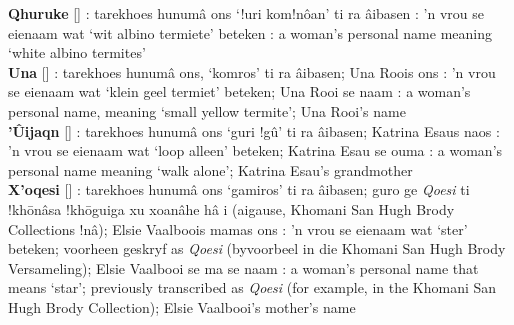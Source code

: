 \textbf{\textvertline{}Qhuruke}
[] : tarekhoes
\textdoublebarpipe{}hunum\^{a} \textvertline{}ons `!uri kom!n\^{o}an'
ti ra \textdoublebarpipe{}\^{a}ibasen : 'n vrou se
eienaam wat `wit albino termiete' beteken : a woman's
personal name meaning `white albino termites' \\

\textbf{\textvertline{}Una} []
: tarekhoes \textdoublebarpipe{}hunum\^{a}
\textvertline{}ons, `komros' ti ra \textdoublebarpipe{}\^{a}ibasen;
\textvertline{}Una Roois \textvertline{}ons : 'n vrou se
eienaam wat `klein geel termiet' beteken; \textvertline{}Una Rooi se
naam : a woman's personal name, meaning `small yellow
termite'; \textvertline{}Una Rooi's name \\

\textbf{\textdoublevertline{}'\^{U}ijaqn}
[]
: tarekhoes \textdoublebarpipe{}hunum\^{a}
\textvertline{}ons `\textvertline{}guri !g\^{u}' ti ra
\textdoublebarpipe{}\^{a}ibasen; Katrina Esaus
\textdoublevertline{}naos : 'n vrou se eienaam wat `loop
alleen' beteken; Katrina Esau se ouma : a woman's
personal name meaning `walk alone'; Katrina Esau's grandmother \\

\textbf{\textdoublevertline{}X'oqesi}
[] :
tarekhoes \textdoublebarpipe{}hunum\^{a} \textvertline{}ons
`\textvertline{}gamiros' ti ra \textdoublebarpipe{}\^{a}ibasen;
\textdoublebarpipe{}guro ge \emph{\textdoublevertline{}Qoesi} ti
!kh\={o}\textdoublevertline{}n\^{a}sa
!kh\={o}\textdoublevertline{}guiga xu xoa\textdoublevertline{}n\^{a}he
h\^{a} i (ai\textdoublevertline{}gause, \textdoublebarpipe{}Khomani
San Hugh Brody Collections !n\^{a}); Elsie Vaalboois mamas
\textvertline{}ons : 'n vrou se eienaam wat `ster'
beteken; voorheen geskryf as \emph{\textdoublevertline{}Qoesi}
(byvoorbeel in die \textdoublebarpipe{}Khomani San Hugh Brody
Versameling); Elsie Vaalbooi se ma se naam : a woman's
personal name that means `star'; previously transcribed as
\emph{\textdoublevertline{}Qoesi} (for example, in the
\textdoublebarpipe{}Khomani San Hugh Brody Collection); Elsie
Vaalbooi's mother's name \\

